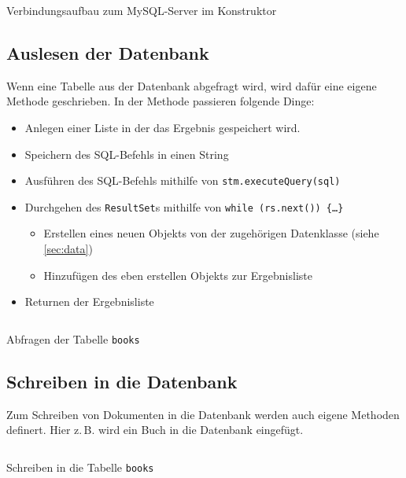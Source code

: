 \documentclass[11pt, DIV=14]{scrartcl}
\let\java\texttt
\newcommand{\zB}{\mbox{z.\,B.}\xspace}
\begin{document}
        \begin{listing}[H]
            \inputminted{java}{code/connect.java}
            \caption{Verbindungsaufbau zum MySQL-Server im Konstruktor}
        \end{listing}

		\subsection{Auslesen der Datenbank}
        Wenn eine Tabelle aus der Datenbank abgefragt wird, wird dafür eine eigene Methode geschrieben. In der Methode passieren folgende Dinge:

        \begin{itemize}
            \item Anlegen einer Liste in der das Ergebnis gespeichert wird.
            \item Speichern des SQL-Befehls in einen String
            \item Ausführen des SQL-Befehls mithilfe von \java{stm.executeQuery(sql)}

            \item Durchgehen des \java{ResultSet}s mithilfe von \java{while (rs.next()) \{\ldots\}}
            \begin{itemize}
                \item Erstellen eines neuen Objekts von der zugehörigen Datenklasse (siehe \autoref{sec:data})
                \item Hinzufügen des eben erstellen Objekts zur Ergebnisliste
            \end{itemize}
            \item Returnen der Ergebnisliste
        \end{itemize}

        \begin{listing}[H]
            \inputminted{java}{code/select.java}
            \caption{Abfragen der Tabelle \texttt{books}}
        \end{listing}

		\subsection{Schreiben in die Datenbank}
		Zum Schreiben von Dokumenten in die Datenbank werden auch eigene Methoden definert.
		Hier \zB wird ein Buch in die Datenbank eingefügt.

		\begin{listing}[H]
            \inputminted[firstline=61, lastline=69, gobble=1]{java}{code/DBConn.java}
            \caption{Schreiben in die Tabelle \texttt{books}}
        \end{listing}
\end{document}
